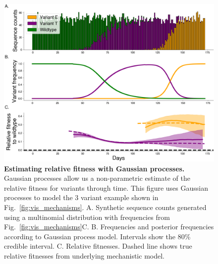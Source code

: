 \documentclass[11pt,oneside,letterpaper]{article}
\begin{document}
\begin{figure}[h]
    \centering
    \includegraphics[width=1.0\linewidth]{./supplementary_figures/gp_example.png}
    \caption{
    \textbf{Estimating relative fitness with Gaussian processes.}
      Gaussian processes allow us a non-parametric estimate of the relative fitness for variants through time.
      This figure uses Gaussian processes to model the 3 variant example shown in Fig.~\ref{fig:vis_mechanisms}.
      A. Synthetic sequence counts generated using a multinomial distribution with frequencies from Fig.~\ref{fig:vis_mechanisms}C.
      B. Frequencies and posterior frequencies according to Gaussian process model. Intervals show the 80\% credible interval.
      C. Relative fitnesses. Dashed line shows true relative fitnesses from underlying mechanistic model.
    }
    \label{fig:gp_example}
\end{figure}
\end{document}
